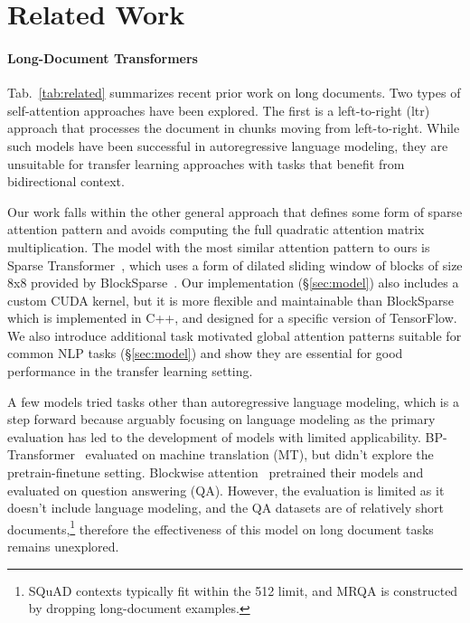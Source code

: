 \documentclass[11pt,a4paper]{article}
\begin{document}
\section{Related Work}
\label{sec:related}

\paragraph{Long-Document Transformers}
Tab.~\ref{tab:related} summarizes recent prior work on long documents. Two types of self-attention approaches have been explored. 
The first is a left-to-right (ltr) approach that processes the document in chunks moving from left-to-right.
While such models have been successful in autoregressive language modeling, they are unsuitable for transfer learning approaches with tasks that benefit from bidirectional context.


Our work falls within the other general approach that defines some form of sparse attention pattern and avoids computing 
the full quadratic attention matrix multiplication.
The model with the most similar attention pattern to ours is Sparse Transformer~\cite{sparseOpenai}, which uses a form of dilated sliding window of blocks of size 8x8 provided by BlockSparse~\cite{blocksparse}. 
Our implementation (\S\ref{sec:model}) also includes a custom CUDA kernel, but it is more flexible and maintainable than BlockSparse which is implemented in C++, and designed for a specific version of TensorFlow.
We also introduce additional task motivated global attention patterns suitable for common NLP tasks
(\S\ref{sec:model}) and show they are essential for good performance in the transfer learning setting.




A few models tried tasks other than autoregressive language modeling,
which is 
a step forward because arguably focusing on 
language modeling as the primary evaluation
has led to the development of models with limited applicability.  BP-Transformer~\cite{BPTransformer} evaluated on 
machine translation (MT), but didn't explore the pretrain-finetune setting.
Blockwise attention~\cite{blockbert} pretrained their models and evaluated 
on question answering (QA). However, the evaluation is 
limited as it doesn't include language modeling, and the QA datasets
are of relatively short documents,\footnote{
SQuAD contexts typically fit within the 512 limit, 
and MRQA is constructed by dropping long-document examples. 
} therefore the effectiveness of this model on long document tasks remains unexplored.
\end{document}
